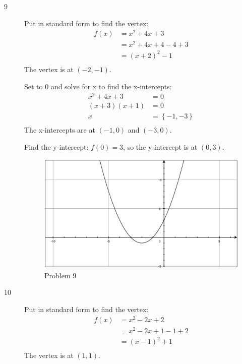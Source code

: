 \documentclass{exam}
\begin{document}
\begin{description}
    \item[9]
      Put in standard form to find the vertex:
      \begin{align*}
        f(x) &= x^2 + 4x + 3 \\
             &= x^2 + 4x + 4 - 4 + 3 \\
             &= (x + 2)^2 - 1 \\
      \end{align*}
      The vertex is at $(-2, -1)$.

      Set to 0 and solve for x to find the x-intercepts:
      \begin{align*}
        x^2 + 4x + 3   &= 0 \\
        (x + 3)(x + 1) &= 0 \\
        x              &= \left\{ -1, -3 \right\} \\
      \end{align*}
      The x-intercepts are at $(-1, 0)$ and $(-3, 0)$.  

      Find the y-intercept: $f(0) = 3$, so the y-intercept is at $(0, 3)$.

      \begin{figure}[H]
        \centering
        \includegraphics[scale=.3]{problem_09.eps}
        \caption*{Problem 9}
      \end{figure}

    \pagebreak

    \item[10]
      Put in standard form to find the vertex:
      \begin{align*}
        f(x) &= x^2 - 2x + 2 \\
             &= x^2 - 2x + 1 - 1 + 2 \\
             &= (x - 1)^2 + 1 \\
      \end{align*}
      The vertex is at $(1, 1)$.


\end{description}
\end{document}
